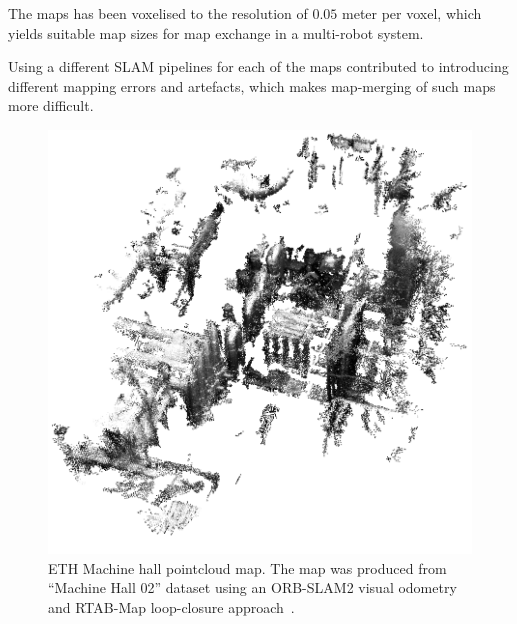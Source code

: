 The maps has been voxelised to the resolution of $0.05$ meter per voxel, which yields suitable map sizes for map exchange in a multi-robot system.

Using a different \gls{SLAM} pipelines for each of the maps contributed to introducing different mapping errors and artefacts, which makes map-merging of such maps more difficult.

\begin{figure}
    \centering
    \includegraphics[width=\textwidth]{../img/euroc_mh_02.png}
    \caption[Machine hall pointcloud map]{ETH Machine hall pointcloud map. The map was produced from ``Machine Hall 02'' dataset using an {ORB-SLAM2} visual odometry~\citep{mur2017orb} and RTAB-Map loop-closure approach~\citep{labbe2014online}.}
    \label{fig:euroc_mh_02}
\end{figure}

